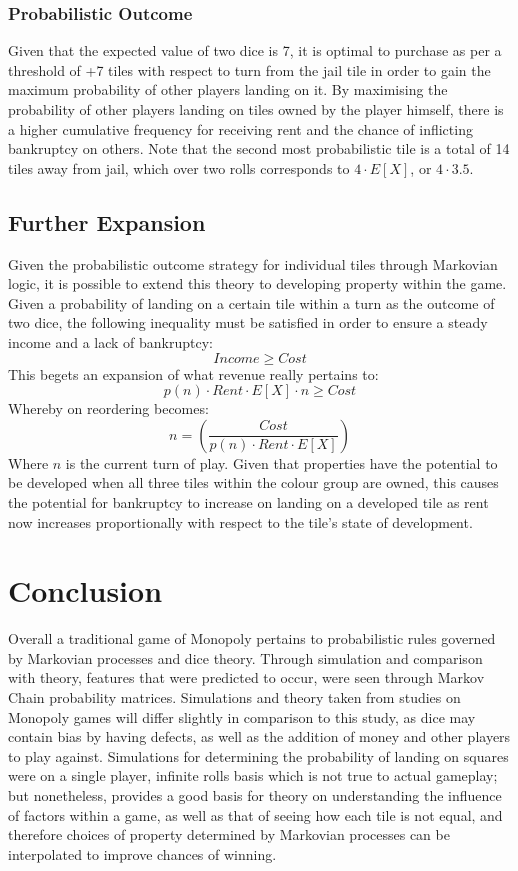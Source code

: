 \documentclass[12pt]{article}
\begin{document}
\subsubsection{Probabilistic Outcome}
Given that the expected value of two dice is 7, it is optimal to purchase as per a threshold of +7 tiles with respect to turn from the jail tile in order to gain the maximum probability of other players landing on it. By maximising the probability of other players landing on tiles owned by the player himself, there is a higher cumulative frequency for receiving rent and the chance of inflicting bankruptcy on others. Note that the second most probabilistic tile is a total of 14 tiles away from jail, which over two rolls corresponds to $4 \cdot E[X]$, or $4\cdot 3.5$.

\subsection{Further Expansion}
Given the probabilistic outcome strategy for individual tiles through Markovian logic, it is possible to extend this theory to developing property within the game. Given a probability of landing on a certain tile within a turn as the outcome of two dice, the following inequality must be satisfied in order to ensure a steady income and a lack of bankruptcy:
$$Income \geq Cost$$
This begets an expansion of what revenue really pertains to:
$$p(n)\cdot Rent\cdot E[X] \cdot n \geq Cost$$
Whereby on reordering becomes:
$$n = \left(\frac{Cost}{p(n)\cdot Rent\cdot E[X]}\right)$$
Where $n$ is the current turn of play. Given that properties have the potential to be developed when all three tiles within the colour group are owned, this causes the potential for bankruptcy to increase on landing on a developed tile as rent now increases proportionally with respect to the tile's state of development.
\section{Conclusion}
Overall a traditional game of Monopoly pertains to probabilistic rules governed by Markovian processes and dice theory. Through simulation and comparison with theory, features that were predicted to occur, were seen through Markov Chain probability matrices. Simulations and theory taken from studies on Monopoly games will differ slightly in comparison to this study, as dice may contain bias by having defects, as well as the addition of money and other players to play against. Simulations for determining the probability of landing on squares were on a single player, infinite rolls basis which is not true to actual gameplay; but nonetheless, provides a good basis for theory on understanding the influence of factors within a game, as well as that of seeing how each tile is not equal, and therefore choices of property determined by Markovian processes can be interpolated to improve chances of winning.
\end{document}
